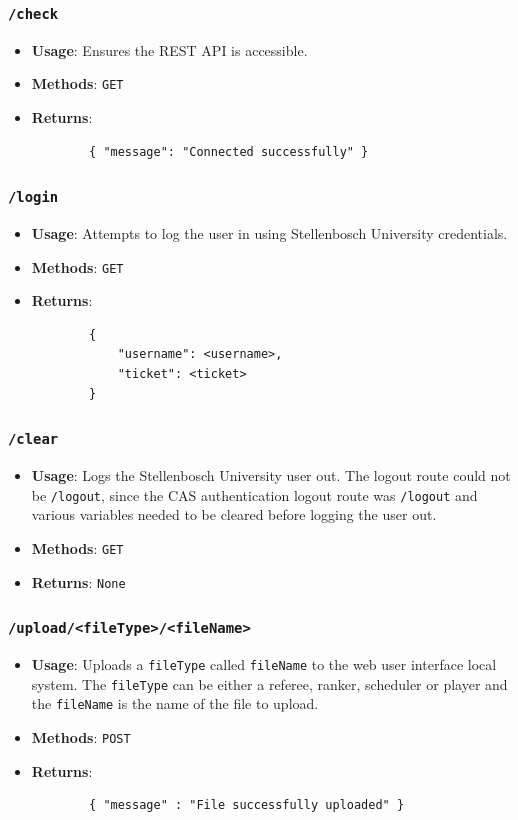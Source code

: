 \documentclass[a4paper, 11pt]{report}
\begin{document}
\subsubsection*{\texttt{/check}}
\begin{itemize}
	\item \textbf{Usage}: Ensures the REST API is accessible.
	\item \textbf{Methods}: \texttt{GET}
	\item \textbf{Returns}:
	\begin{verbatim}
		{ "message": "Connected successfully" }
	\end{verbatim}
\end{itemize}
\subsubsection*{\texttt{/login}}
\begin{itemize}
	\item \textbf{Usage}: Attempts to log the user in using Stellenbosch
	University credentials.
	\item \textbf{Methods}: \texttt{GET}
	\item \textbf{Returns}:
	\begin{verbatim}
		{
		    "username": <username>,
		    "ticket": <ticket>
		}
	\end{verbatim}
\end{itemize}
\subsubsection*{\texttt{/clear}}
\begin{itemize}
	\item \textbf{Usage}: Logs the Stellenbosch University user out. The logout
	route could not be \texttt{/logout}, since the CAS authentication logout route
	was \texttt{/logout} and various variables needed to be cleared before logging
	the user out.
	\item \textbf{Methods}: \texttt{GET}
	\item \textbf{Returns}: \texttt{None}
\end{itemize}
\subsubsection*{\texttt{/upload/<fileType>/<fileName>}}
\begin{itemize}
	\item \textbf{Usage}: Uploads a \texttt{fileType} called \texttt{fileName}
	to the web user interface local system. The \texttt{fileType} can be either
	a referee, ranker, scheduler or player and the \texttt{fileName} is the name
	of the file to upload.
	\item \textbf{Methods}: \texttt{POST}
	\item \textbf{Returns}:
	\begin{verbatim}
		{ "message" : "File successfully uploaded" }
	\end{verbatim}
\end{itemize}
\end{document}
